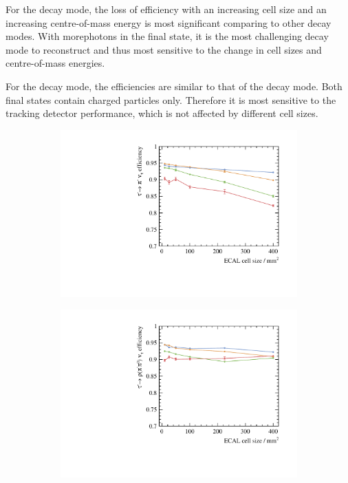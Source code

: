 For the \tauToAiPhoton decay mode, the loss of efficiency with an increasing \ECAL  cell size and an increasing centre-of-mass energy is most significant comparing to other decay modes. With morephotons in the final state, it is the most challenging decay mode to reconstruct and thus most sensitive to the change in cell sizes and centre-of-mass energies.

For the \tauToAiPion decay mode, the efficiencies are similar to that of the \tauToPion decay mode. Both final states contain charged particles only. Therefore it is most sensitive to the tracking detector performance, which is not affected by different \ECAL cell sizes.


\begin{figure}[htbp]
\centering %
\begin{subfigure}[b]{0.45\textwidth}
  \includegraphics[width=\textwidth]{tau/plots3/decayMode2.pdf}
  \caption{}
  \label{fig:tauDecayMode2}
\end{subfigure}
\begin{subfigure}[b]{0.45\textwidth}
  \includegraphics[width=\textwidth]{tau/plots3/decayMode3.pdf}

\end{subfigure}
\end{figure}
